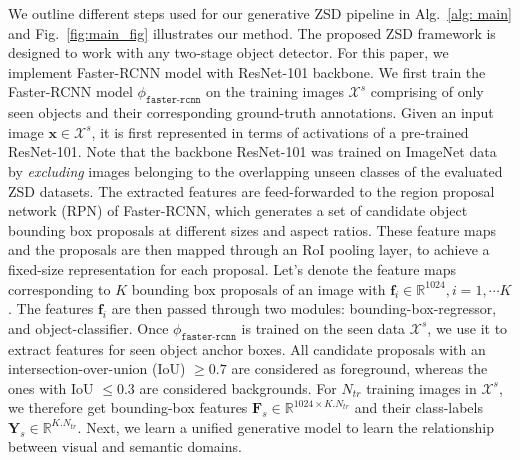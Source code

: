 \documentclass[runningheads]{llncs}
\begin{document}
We outline different steps used for our generative ZSD pipeline in Alg.~\ref{alg: main} and Fig.~\ref{fig:main_fig} illustrates our method. The proposed ZSD framework is designed to work with any two-stage object detector. For this paper, we implement Faster-RCNN model with ResNet-101 backbone. We first train the Faster-RCNN model $\phi_{\texttt{faster-rcnn}}$ on the training images $ \mathcal{X}^{s}$ comprising of only seen objects and their corresponding ground-truth annotations. Given an input image $\mathbf{x} \in \mathcal{X}^{s}$, it is first represented in terms of activations of a pre-trained ResNet-101. Note that the backbone ResNet-101 was trained on ImageNet data by \emph{excluding} images belonging to the overlapping unseen classes of the evaluated ZSD datasets. The extracted features are feed-forwarded to the region proposal network (RPN) of Faster-RCNN, which generates a set of candidate object bounding box proposals at different sizes and aspect ratios. These feature maps and the proposals are then mapped through an RoI pooling layer, to achieve a fixed-size representation for each proposal. Let's denote the feature maps corresponding to $K$ bounding box proposals of an image with $\mathbf{f}_i \in \mathbb{R}^{1024}, i=1,\cdots K$. The features $\mathbf{f}_i$ are then passed through two modules: bounding-box-regressor, and object-classifier. Once $\phi_{\texttt{faster-rcnn}}$ is trained on the seen data $ \mathcal{X}^{s}$, we use it to extract features for seen object anchor boxes. All candidate proposals with an intersection-over-union (IoU) $\ge 0.7$ are considered as foreground, whereas the ones with IoU $\le 0.3$ are considered backgrounds. For $N_{tr}$ training images in $\mathcal{X}^{s}$, we therefore get bounding-box features $\mathbf{F}_s \in \mathbb{R}^{1024 \times K.N_{tr}}$ and their class-labels $\mathbf{Y}_s \in \mathbb{R}^{K.N_{tr}}$. Next, we learn a unified generative model to learn the relationship between visual and semantic domains. 
\end{document}
